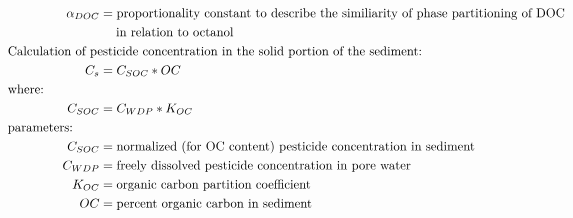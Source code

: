 \documentclass[10pt]{article}
\begin{document}
\begin{align}
\alpha_{DOC} & = \text{proportionality constant to describe the similiarity of phase partitioning of DOC}\nonumber\\ &\hspace{1.3em} \text{in relation to octanol}\nonumber\\
&    \hspace{-1.0in}  \text{Calculation of pesticide concentration in the solid portion of the sediment:} \nonumber \\
C_{s} & = C_{SOC} * OC \nonumber \\
&    \hspace{-1.0in}  \text{where:} \nonumber \\
C_{SOC} & = C_{WDP} * K_{OC}\nonumber \\
&    \hspace{-1.0in}  \text{parameters:} \nonumber \\
C_{SOC} & = \text{normalized (for OC content) pesticide concentration in sediment} \nonumber \\
C_{WDP} & = \text{freely dissolved pesticide concentration in pore water} \nonumber \\
K_{OC} & = \text{organic carbon partition coefficient} \nonumber\\
OC & = \text{percent organic carbon in sediment} \nonumber\\
\end{align}
\end{document}
